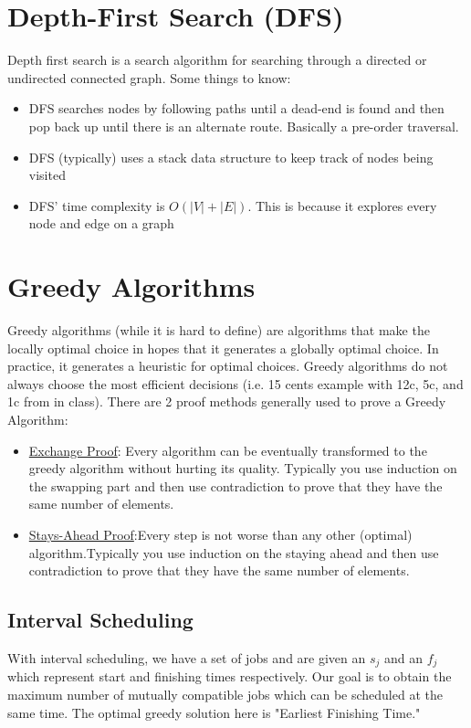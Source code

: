 \documentclass{article}
\begin{document}
\section{Depth-First Search (DFS)}
Depth first search is a search algorithm for searching through a directed or undirected connected graph. Some things to know:

\begin{itemize}
    \item DFS searches nodes by following paths until a dead-end is found and then pop back up until there is an alternate route. Basically a pre-order traversal. 
    \item DFS (typically) uses a stack data structure to keep track of nodes being visited
    \item DFS' time complexity is $O(|V|+|E|)$. This is because it explores every node and edge on a graph
\end{itemize}

\section{Greedy Algorithms}
Greedy algorithms (while it is hard to define) are algorithms that make the locally optimal choice in hopes that it generates a globally optimal choice. In practice, it generates a heuristic for optimal choices. Greedy algorithms do not always choose the most efficient decisions (i.e. 15 cents example with 12c, 5c, and 1c from in class). There are 2 proof methods generally used to prove a Greedy Algorithm:

\begin{itemize}
    \item \underline{Exchange Proof}: Every algorithm can be eventually transformed to the greedy algorithm without hurting its quality. Typically you use induction on the swapping part and then use contradiction to prove that they have the same number of elements.
    \item \underline{Stays-Ahead Proof}:Every step is not worse than any other (optimal) algorithm.Typically you use induction on the staying ahead and then use contradiction to prove that they have the same number of elements.
\end{itemize}

\subsection{Interval Scheduling}
With interval scheduling, we have a set of jobs and are given an $s_j$ and an $f_j$ which represent start and finishing times respectively. Our goal is to obtain the maximum number of mutually compatible jobs which can be scheduled at the same time. The optimal greedy solution here is "Earliest Finishing Time." 
\end{document}
